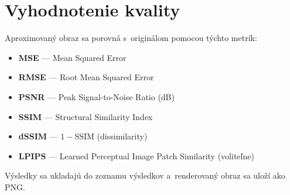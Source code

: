 \documentclass[a4paper,11pt]{article}
\begin{document}
\section{Vyhodnotenie kvality}
\label{sec:evaluation}

Aproximovaný obraz sa porovná s~originálom pomocou týchto metrík:
\begin{itemize}[nosep]
  \item \textbf{MSE} --- Mean Squared Error
  \item \textbf{RMSE} --- Root Mean Squared Error
  \item \textbf{PSNR} --- Peak Signal-to-Noise Ratio (dB)
  \item \textbf{SSIM} --- Structural Similarity Index
  \item \textbf{dSSIM} --- $1 - \text{SSIM}$ (dissimilarity)
  \item \textbf{LPIPS} --- Learned Perceptual Image Patch Similarity (voliteľne)
\end{itemize}

Výsledky sa ukladajú do zoznamu výsledkov a~renderovaný obraz sa uloží ako PNG.
\end{document}
